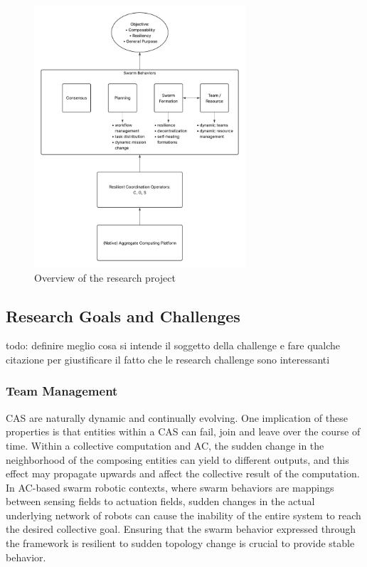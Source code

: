 \documentclass[12pt]{article}
\begin{document}
\begin{figure}
	\centering
	\includegraphics[width=0.7\textwidth]{figures/ResearchProject.png}
	\caption{Overview of the research project}
	 \label{fig:research-project}
\end{figure}

\subsection{Research Goals and Challenges}
\label{sec:challenges}
todo: definire meglio cosa si intende il soggetto della challenge e fare qualche citazione per giustificare il fatto che le research challenge sono interessanti

\subsubsection{Team Management}
CAS are naturally dynamic and continually evolving. One implication of these properties is that entities within a CAS can fail, join and leave over the course of time.
Within a collective computation and AC, the sudden change in the neighborhood of the composing entities can yield to different outputs, and this effect may propagate upwards and
affect the collective result of the computation. In AC-based swarm robotic contexts, where swarm behaviors are mappings between sensing fields to actuation fields, sudden changes
in the actual underlying network of robots can cause the inability of the entire system to reach the desired collective goal. Ensuring that the swarm behavior expressed through the
framework is resilient to sudden topology change is crucial to provide stable behavior. 
\end{document}
